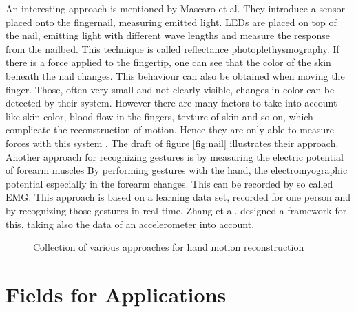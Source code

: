 An interesting approach is mentioned by Mascaro et al. They introduce a sensor placed onto the fingernail, measuring emitted light. LEDs are placed on top of the nail, emitting light with different wave lengths and measure the response from the nailbed. This technique is called reflectance photoplethysmography. If there is a force applied to the fingertip, one can see that the color of the skin beneath the nail changes. This behaviour can also be obtained when moving the finger. Those, often very small and not clearly visible, changes in color can be detected by their system. However there are many factors to take into account like skin color, blood flow in the fingers, texture of skin and so on, which complicate the reconstruction of motion. Hence they are only able to measure forces with this system \cite{mascaro2001photoplethysmograph}. The draft of figure \ref{fig:nail} illustrates their approach.\\
Another approach for recognizing gestures is by measuring the electric potential of forearm muscles \cite{kim2008emg} By performing gestures with the hand, the electromyographic potential especially in the forearm changes. This can be recorded by so called \ac{EMG}. This approach is based on a learning data set, recorded for one person and by recognizing those gestures in real time. Zhang et al. designed a framework for this, taking also the data of an accelerometer into account.

\begin{figure}[h]
	\hfill
	\hfill
	\hfill
	
	\caption{Collection of various approaches for hand motion reconstruction}
	\label{fig:examplesOther}
\end{figure}

\section{Fields for Applications} \label{sec:applications}

